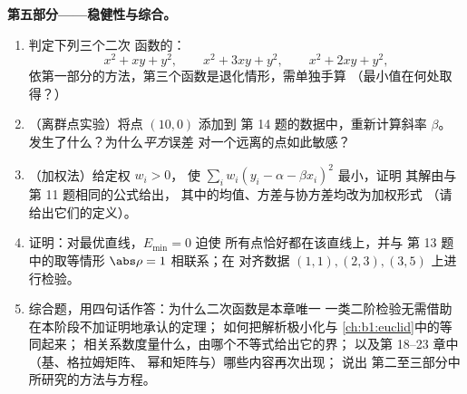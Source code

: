 \begin{problem}
\medskip
\noindent\textbf{第五部分——稳健性与综合。}
\begin{enumerate}[resume]
  \item 判定下列三个二次
        函数的：
        \[
        x^2 + xy + y^2, \qquad x^2 + 3xy + y^2, \qquad
        x^2 + 2xy + y^2 ,
        \]
        依第一部分的方法，第三个函数是退化情形，需单独手算
        （最小值在何处取得？）
  \item （离群点实验）将点 $(10, 0)$ 添加到
        第 14 题的数据中，重新计算斜率 $\beta$。
        发生了什么？为什么\emph{平方}误差
        对一个远离的点如此敏感？
  \item （加权法）给定权 $w_i > 0$，
        使 $\sum_i w_i(y_i - \alpha - \beta x_i)^2$ 最小，证明
        其解由与第 11 题相同的公式给出，
        其中的均值、方差与协方差均改为加权形式
        （请给出它们的定义）。
  \item 证明：对最优直线，$E_{\min} = 0$ 迫使
        所有点恰好都在该直线上，并与
        第 13 题中的取等情形 $\abs\rho = 1$ 相联系；在
        对齐数据 $(1,1), (2,3), (3,5)$ 上进行检验。
  \item 综合题，用四句话作答：为什么二次函数是本章唯一
        一类二阶检验无需借助在本阶段不加证明地承认的定理；
        如何把解析极小化与
        \cref{ch:b1:euclid}中的等同起来；
        相关系数度量什么，由哪个不等式给出它的界；
        以及第 18--23 章中（基、格拉姆矩阵、
        幂和矩阵与）哪些内容再次出现；
        说出
        第二至三部分中所研究的方法与方程。
\end{enumerate}
\end{problem}
